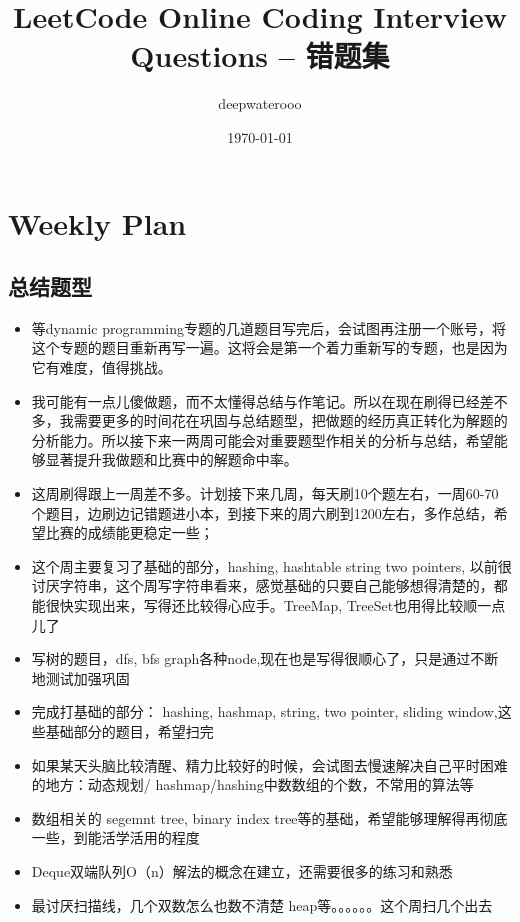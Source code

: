 \documentclass[9pt, b5paaper]{book}
\author{deepwaterooo}
\date{\today}
\title{LeetCode Online Coding Interview Questions -- 错题集}
\begin{document}
\maketitle
\tableofcontents


\chapter{Weekly Plan}
\label{sec-1}
\section{总结题型}
\label{sec-1-1}
\begin{itemize}
\item 等dynamic programming专题的几道题目写完后，会试图再注册一个账号，将这个专题的题目重新再写一遍。这将会是第一个着力重新写的专题，也是因为它有难度，值得挑战。

\item 我可能有一点儿傻做题，而不太懂得总结与作笔记。所以在现在刷得已经差不多，我需要更多的时间花在巩固与总结题型，把做题的经历真正转化为解题的分析能力。所以接下来一两周可能会对重要题型作相关的分析与总结，希望能够显著提升我做题和比赛中的解题命中率。

\item 这周刷得跟上一周差不多。计划接下来几周，每天刷10个题左右，一周60-70个题目，边刷边记错题进小本，到接下来的周六刷到1200左右，多作总结，希望比赛的成绩能更稳定一些；

\item 这个周主要复习了基础的部分，hashing, hashtable string two pointers, 以前很讨厌字符串，这个周写字符串看来，感觉基础的只要自己能够想得清楚的，都能很快实现出来，写得还比较得心应手。TreeMap, TreeSet也用得比较顺一点儿了
\item 写树的题目，dfs, bfs graph各种node,现在也是写得很顺心了，只是通过不断地测试加强巩固

\item 完成打基础的部分： hashing, hashmap, string, two pointer, sliding window,这些基础部分的题目，希望扫完
\item 如果某天头脑比较清醒、精力比较好的时候，会试图去慢速解决自己平时困难的地方：动态规划/ hashmap/hashing中数数组的个数，不常用的算法等

\item 数组相关的 segemnt tree, binary index tree等的基础，希望能够理解得再彻底一些，到能活学活用的程度
\item Deque双端队列O（n）解法的概念在建立，还需要很多的练习和熟悉
\item 最讨厌扫描线，几个双数怎么也数不清楚 heap等。。。。。。这个周扫几个出去


\end{itemize}
\end{document}

